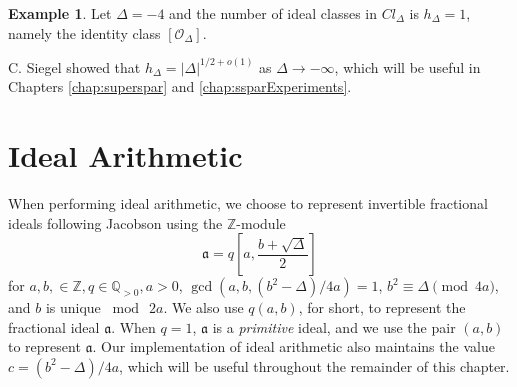 \documentclass{ucalgthes1}
\theoremstyle{definition}
\newtheorem{example}[thm]{Example}
\newcommand{\ZZ}{\mathbb{Z}}
\newcommand{\QQgtz}{\mathbb{Q}_{>0}}
\newcommand{\ideal}{\mathfrak}
\newcommand{\idclass}{[\mathcal O_\Delta]}
\begin{document}
\begin{example}
Let $\Delta = -4$ and the number of ideal classes in $Cl_\Delta$ is $h_\Delta = 1$, namely the identity class $\idclass$.
\end{example}

\noindent
C. Siegel \cite[p.247]{Crandall2001} showed that $h_\Delta = |\Delta|^{1/2 + o(1)}$ as $\Delta \rightarrow -\infty$, which will be useful in Chapters \ref{chap:superspar} and \ref{chap:ssparExperiments}.


\section{Ideal Arithmetic}
\label{sec:idealArithmetic}

%


When performing ideal arithmetic, we choose to represent invertible fractional ideals following Jacobson \cite[p.13, Equation 2.1]{Jacobson1999} using the $\ZZ$-module
\[
	\ideal a = q\left[a, \frac{b+\sqrt{\Delta}}{2} \right]
\]
for $a, b, \in \ZZ, q \in \QQgtz, a > 0$, $\gcd(a, b, (b^2-\Delta)/4a) = 1$, $b^2 \equiv \Delta \pmod{4a}$, and $b$ is unique $\bmod ~2a$.  We also use $q(a, b)$, for short, to represent the fractional ideal $\ideal a$.  When $q = 1$, $\ideal a$ is a \emph{primitive} ideal, and we use the pair $(a, b)$ to represent $\ideal a$.  Our implementation of ideal arithmetic also maintains the value $c = (b^2 - \Delta)/4a$, which will be useful throughout the remainder of this chapter.
\end{document}
